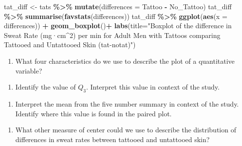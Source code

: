 \documentclass[
]{report}
\newenvironment{Shaded}{\begin{snugshade}}{\end{snugshade}}
\newcommand{\AttributeTok}[1]{\textcolor[rgb]{0.13,0.29,0.53}{#1}}
\newcommand{\FunctionTok}[1]{\textcolor[rgb]{0.13,0.29,0.53}{\textbf{#1}}}
\newcommand{\NormalTok}[1]{#1}
\newcommand{\OtherTok}[1]{\textcolor[rgb]{0.56,0.35,0.01}{#1}}
\newcommand{\SpecialCharTok}[1]{\textcolor[rgb]{0.81,0.36,0.00}{\textbf{#1}}}
\newcommand{\StringTok}[1]{\textcolor[rgb]{0.31,0.60,0.02}{#1}}
\providecommand{\tightlist}{%
  \setlength{\itemsep}{0pt}\setlength{\parskip}{0pt}}
\begin{document}
\begin{Shaded}
\begin{Highlighting}[]
\NormalTok{tat\_diff }\OtherTok{\textless{}{-}}\NormalTok{ tats }\SpecialCharTok{\%\textgreater{}\%} 
    \FunctionTok{mutate}\NormalTok{(}\AttributeTok{differences =}\NormalTok{ Tattoo }\SpecialCharTok{{-}}\NormalTok{ No\_Tattoo) }
\NormalTok{tat\_diff }\SpecialCharTok{\%\textgreater{}\%} 
    \FunctionTok{summarise}\NormalTok{(}\FunctionTok{favstats}\NormalTok{(differences))}
\NormalTok{tat\_diff }\SpecialCharTok{\%\textgreater{}\%} 
    \FunctionTok{ggplot}\NormalTok{(}\FunctionTok{aes}\NormalTok{(}\AttributeTok{x =}\NormalTok{ differences)) }\SpecialCharTok{+}
    \FunctionTok{geom\_boxplot}\NormalTok{()}\SpecialCharTok{+}
    \FunctionTok{labs}\NormalTok{(}\AttributeTok{title=}\StringTok{"Boxplot of the difference in Sweat Rate (mg·cm\^{}2) per min for Adult Men }
\StringTok{         with Tattoos comparing Tattooed and Untattooed Skin (tat{-}notat)"}\NormalTok{) }
\end{Highlighting}
\end{Shaded}

\begin{enumerate}
\def\labelenumi{\arabic{enumi}.}
\setcounter{enumi}{10}
\tightlist
\item
  What four characteristics do we use to describe the plot of a quantitative variable?
\end{enumerate}

\vspace{0.6in}

\begin{enumerate}
\def\labelenumi{\arabic{enumi}.}
\setcounter{enumi}{11}
\tightlist
\item
  Identify the value of \(Q_3\). Interpret this value in context of the study.
\end{enumerate}

\vspace{0.8in}

\begin{enumerate}
\def\labelenumi{\arabic{enumi}.}
\setcounter{enumi}{12}
\tightlist
\item
  Interpret the mean from the five number summary in context of the study. Identify where this value is found in the paired plot.
\end{enumerate}

\vspace{0.6in}

\begin{enumerate}
\def\labelenumi{\arabic{enumi}.}
\setcounter{enumi}{13}
\tightlist
\item
  What other measure of center could we use to describe the distribution of differences in sweat rates between tattooed and untattooed skin?
\end{enumerate}
\end{document}
